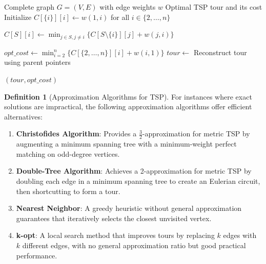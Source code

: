 \documentclass{article}
\theoremstyle{definition}
\newtheorem{definition}{Definition}
\begin{document}
\begin{algorithm}[H]
\caption{Held-Karp Algorithm}
\begin{algorithmic}[1]
\Require Complete graph $G = (V, E)$ with edge weights $w$
\Ensure Optimal TSP tour and its cost
    \State Initialize $C[\{i\}][i] \leftarrow w(1, i)$ for all $i \in \{2,\ldots,n\}$
    
                \State $C[S][i] \leftarrow \min_{j \in S, j \neq i} \{C[S \setminus \{i\}][j] + w(j, i)\}$
            \EndFor
        \EndFor
    \EndFor
    
    \State $opt\_cost \leftarrow \min_{i=2}^{n} \{C[\{2,\ldots,n\}][i] + w(i, 1)\}$
    \State $tour \leftarrow$ Reconstruct tour using parent pointers
    
    \State \Return $(tour, opt\_cost)$
\EndFunction
\end{algorithmic}
\end{algorithm}

\begin{definition}[Approximation Algorithms for TSP]
For instances where exact solutions are impractical, the following approximation algorithms offer efficient alternatives:

\begin{enumerate}
    \item \textbf{Christofides Algorithm}: Provides a $\frac{3}{2}$-approximation for metric TSP by augmenting a minimum spanning tree with a minimum-weight perfect matching on odd-degree vertices.
    
    \item \textbf{Double-Tree Algorithm}: Achieves a 2-approximation for metric TSP by doubling each edge in a minimum spanning tree to create an Eulerian circuit, then shortcutting to form a tour.
    
    \item \textbf{Nearest Neighbor}: A greedy heuristic without general approximation guarantees that iteratively selects the closest unvisited vertex.
    
    \item \textbf{k-opt}: A local search method that improves tours by replacing $k$ edges with $k$ different edges, with no general approximation ratio but good practical performance.
\end{enumerate}
\end{definition}
\end{document}
